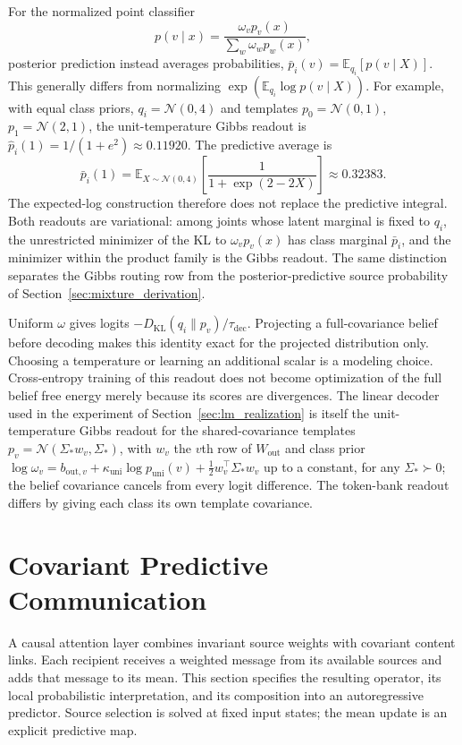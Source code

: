 \documentclass[twoside,11pt]{article}
\begin{document}
For the normalized point classifier
\begin{equation}
p(v\mid x)=\frac{\omega_vp_v(x)}
{\sum_w\omega_wp_w(x)},
\label{eq:readout_point_classifier}
\end{equation}
posterior prediction instead averages probabilities,
$\bar p_i(v)=\mathbb E_{q_i}[p(v\mid X)]$. This generally differs from normalizing $\exp(\mathbb E_{q_i}\log p(v\mid X))$. For example, with equal class priors, $q_i=\mathcal N(0,4)$ and templates $p_0=\mathcal N(0,1)$, $p_1=\mathcal N(2,1)$, the unit-temperature Gibbs readout is $\hat p_i(1)=1/(1+e^2)\approx0.11920$. The predictive average is
\begin{equation}
\bar p_i(1)=\mathbb E_{X\sim\mathcal N(0,4)}
\left[\frac{1}{1+\exp(2-2X)}\right]\approx0.32383.
\end{equation}
The expected-log construction therefore does not replace the predictive integral. Both readouts are variational: among joints whose latent marginal is fixed to $q_i$, the unrestricted minimizer of the KL to $\omega_vp_v(x)$ has class marginal $\bar p_i$, and the minimizer within the product family is the Gibbs readout. The same distinction separates the Gibbs routing row from the posterior-predictive source probability of Section~\ref{sec:mixture_derivation}.

Uniform $\omega$ gives logits $-D_{\mathrm{KL}}(q_i\|p_v)/\tau_{\mathrm{dec}}$. Projecting a full-covariance belief before decoding makes this identity exact for the projected distribution only. Choosing a temperature or learning an additional scalar is a modeling choice. Cross-entropy training of this readout does not become optimization of the full belief free energy merely because its scores are divergences. The linear decoder used in the experiment of Section~\ref{sec:lm_realization} is itself the unit-temperature Gibbs readout for the shared-covariance templates $p_v=\mathcal N(\Sigma_*w_v,\Sigma_*)$, with $w_v$ the $v$th row of $W_{\mathrm{out}}$ and class prior $\log\omega_v=b_{\mathrm{out},v}+\kappa_{\mathrm{uni}}\log p_{\mathrm{uni}}(v)+\tfrac12w_v^\top\Sigma_*w_v$ up to a constant, for any $\Sigma_*\succ0$; the belief covariance cancels from every logit difference. The token-bank readout differs by giving each class its own template covariance.

\section{Covariant Predictive Communication}
\label{sec:relational_communication}
A causal attention layer combines invariant source weights with covariant content links. Each recipient receives a weighted message from its available sources and adds that message to its mean. This section specifies the resulting operator, its local probabilistic interpretation, and its composition into an autoregressive predictor. Source selection is solved at fixed input states; the mean update is an explicit predictive map.
\end{document}
